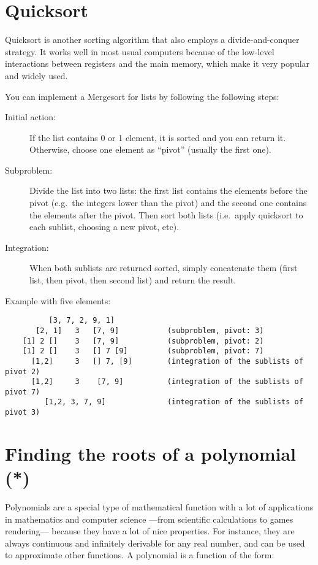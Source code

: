 \documentclass{article}
\begin{document}
\section{Quicksort}
\label{sec:quicksort}

Quicksort is another sorting algorithm that also employs a
divide-and-conquer strategy. It works well in most usual computers
because of the low-level interactions between registers and the main
memory, which make it very popular and widely used. 

You can implement a Mergesort for lists
by following the following steps: 

\begin{description}
\item[Initial action: ] If the list contains 0 or 1 element, it is
  sorted and you can return it. Otherwise, choose one element as
  ``pivot'' (usually the first one). 
\item[Subproblem: ] Divide the
  list into two lists: the first list contains the elements before the
  pivot (e.g.~the integers lower than the pivot) and the second one
  contains the elements after the pivot. Then sort both lists
  (i.e.~apply quicksort to each sublist, choosing a new pivot, etc).
\item[Integration: ] When both sublists are returned sorted,
  simply concatenate them (first list, then pivot, then second list)
  and return the result.
\end{description}

Example with five elements: 

\begin{verbatim}
          [3, 7, 2, 9, 1]            
       [2, 1]   3   [7, 9]           (subproblem, pivot: 3)
    [1] 2 []    3   [7, 9]           (subproblem, pivot: 2)   
    [1] 2 []    3   [] 7 [9]         (subproblem, pivot: 7)
      [1,2]     3   [] 7, [9]        (integration of the sublists of pivot 2)
      [1,2]     3    [7, 9]          (integration of the sublists of pivot 7)
         [1,2, 3, 7, 9]              (integration of the sublists of pivot 3)
\end{verbatim}

\section{Finding the roots of a polynomial (*)}
\label{sec:find-roots-polyn}

Polynomials are a special type of mathematical function with a lot of
applications in mathematics and computer science ---from scientific
calculations to games rendering--- because they have a lot of nice
properties. For instance, they are always continuous and infinitely
derivable for any real number, and can be used to approximate other
functions. A polynomial is a function of the form:
\end{document}
